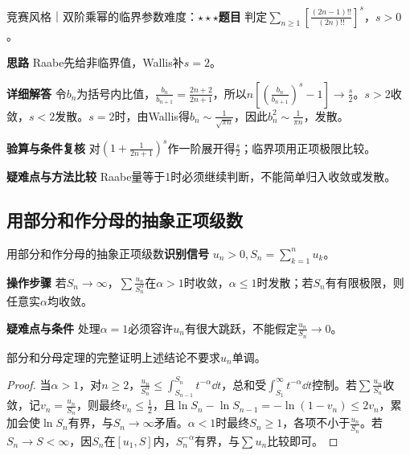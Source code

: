 \begin{example}{竞赛风格｜双阶乘幂的临界参数}{难度：$\star\star\star$}\label{ic:ex:delta_series:doublefactorial}\textbf{题目} 判定$\sum_{n\ge1}[\frac{(2n-1)!!}{(2n)!!}]^s$，$s>0$。\par \textbf{思路} Raabe先给非临界值，Wallis补$s=2$。\par \textbf{详细解答} 令$b_n$为括号内比值，$\frac{b_n}{b_{n+1}}=\frac{2n+2}{2n+1}$，所以$n[(\frac{b_n}{b_{n+1}})^s-1]\to \frac{s}{2}$。$s>2$收敛，$s<2$发散。$s=2$时，由Wallis得$b_n\sim\frac{1}{\sqrt{\pi n}}$，因此$b_n^2\sim\frac{1}{\pi n}$，发散。\par \textbf{验算与条件复核} 对$(1+\frac{1}{2n+1})^s$作一阶展开得$\frac{s}{2}$；临界项用正项极限比较。\par \textbf{疑难点与方法比较} Raabe量等于1时必须继续判断，不能简单归入收敛或发散。\end{example}

\subsection{用部分和作分母的抽象正项级数}\label{ic:delta_series:partialsums}\begin{method}{用部分和作分母的抽象正项级数}\textbf{识别信号} $u_n>0,S_n=\sum_{k=1}^nu_k$。\par \textbf{操作步骤} 若$S_n\to\infty$，$\sum \frac{u_n}{S_n^\alpha}$在$\alpha>1$时收敛，$\alpha\le1$时发散；若$S_n$有有限极限，则任意实$\alpha$均收敛。\par \textbf{疑难点与条件} 处理$\alpha=1$必须容许$u_n$有很大跳跃，不能假定$\frac{u_n}{S_n}\to0$。\end{method}

\begin{theorem}{部分和分母定理的完整证明}上述结论不要求$u_n$单调。\end{theorem}\begin{proof}当$\alpha>1$，对$n\ge2$，$\frac{u_n}{S_n^\alpha}\le\int_{S_{n-1}}^{S_n}t^{-\alpha}\dd t$，总和受$\int_{S_1}^\infty t^{-\alpha}\dd t$控制。若$\sum \frac{u_n}{S_n}$收敛，记$v_n=\frac{u_n}{S_n}$，则最终$v_n\le\frac{1}{2}$，且$\ln S_n-\ln S_{n-1}=-\ln(1-v_n)\le2v_n$，累加会使$\ln S_n$有界，与$S_n\to\infty$矛盾。$\alpha<1$时最终$S_n\ge1$，各项不小于$\frac{u_n}{S_n}$。若$S_n\to S<\infty$，因$S_n$在$[u_1,S]$内，$S_n^{-\alpha}$有界，与$\sum u_n$比较即可。\end{proof}

